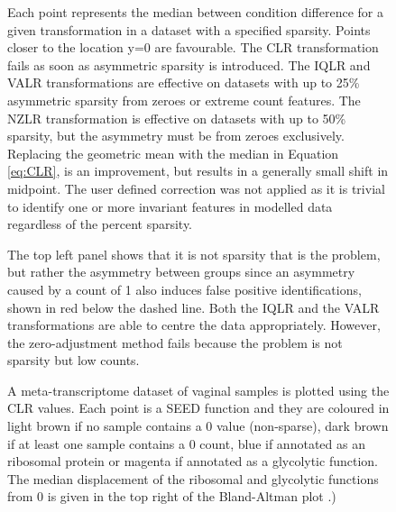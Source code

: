 \documentclass{bmcart}
\def\texttt{[image: ]}
\begin{document}
\begin{backmatter}
\begin{figure}[h!]
\caption{ Each point represents the median between condition difference for a given transformation in a dataset with a specified sparsity. Points closer to the location y=0 are favourable. The CLR transformation fails as soon as asymmetric sparsity is introduced. The IQLR and VALR transformations are effective on datasets with up to 25\% asymmetric sparsity from zeroes or extreme count features. The NZLR transformation is effective on datasets with up to 50\% sparsity, but the asymmetry must be from zeroes exclusively. Replacing the geometric mean with the median in Equation \ref{eq:CLR}, is an improvement, but results in a generally small shift in midpoint. The user defined correction was not applied as it is trivial to identify one or more invariant features in modelled data regardless of the percent sparsity.}
\label{Fig:failure}
\end{figure}

\begin{figure}[!t]
\caption{ The top left panel shows that it is not sparsity that is the problem, but rather the asymmetry  between groups since an asymmetry caused by a count of 1 also induces false positive identifications, shown in red below the dashed line. Both the IQLR and the VALR transformations are able to centre the data appropriately. However, the zero-adjustment method fails because the problem is not sparsity but low counts.}
\label{Fig:ones}
\end{figure}

\begin{figure}[h!]
\caption{ A meta-transcriptome dataset of vaginal samples is plotted using the CLR values. Each point is a SEED function \cite{Mitra:2011} and they are coloured in light brown if no sample contains a 0 value (non-sparse), dark brown if at least one sample contains a 0 count, blue if annotated as an ribosomal protein or magenta if annotated as a glycolytic function. The median displacement of the ribosomal and glycolytic functions from 0 is given in the top right of the Bland-Altman plot \cite{altman:1983}.) }
\label{Fig:bv}
\end{figure}



\end{backmatter}
\end{document}
